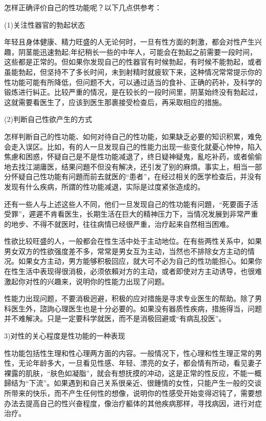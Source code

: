 \documentclass[12pt,UTF8]{ctexbook}
\begin{document}
怎样正确评价自己的性功能呢？以下几点供参考：

(1)关注性器官的勃起状态

年轻且身体健康、精力旺盛的人无论何时，一旦有性方面的刺激，都会对性产生兴趣，阴茎能迅速勃起;年纪稍长一些的中年人，可能会在勃起之前需要一段时间，这些都是正常的。但如果你发现自己的性器官有时候勃起，有时候不能勃起，或者虽能勃起，但坚持不了多长时间，未到射精时就疲软下来，这种情况常常提示你的性功能可能有所降低，但问题不大，可以通过适当的食补、正确的药补，及科学的锻炼进行糾正。比较严重的情况，是在较长的一段时间里，阴茎始终没有勃起过，这就需要看医生了，应该到医生那裹接受检查后，再采取相应的措施。

(2)判断自己性欲产生的方式

怎样判断自己的性功能、如何对待自己的性功能，如果缺乏必要的知识积累，难免会走入误区。比如，有的人一旦发现自己的性能力出现一些变化就憂心忡忡，陷入焦慮和困惑，怀疑自己是不是性功能减退了，终日疑神疑鬼，亂吃补药，或者偷偷地去找江湖庸医，结果问題不但没有解决，还引发了别的麻煩。事实上，相当一部分怀疑自己性功能有问題而前去就医的“患者”，在经过相关的医学检查后，并没有发现有什么疾病，所謂的性功能减退，实际是过度紧张造成的。

还有一些人与上述这些人不同，他们一旦发现自己的性功能有问題，“死要面子活受罪”，遲遲不肯看医生，长期生活在巨大的精神压力下，当情况发展到非常严重的地步、不得不就医时，往往病情已经很严重，治疗起来自然相当困难。

性欲比较旺盛的人，一般都会在性生活中处于主动地位。在有些两性关系中，如果男女双方的性欲强度差不多，常常是男女互为主动，当然也不排除女方主动的情况。如果女方主动，男方能够积极回应，就大可不必为自己的性功能担心。如果你在性生活中表现得很消极，必须依賴对方的主动，或者即使对方主动诱导，也很难激起你对性的兴趣来，说明你的性能力出现了问题。

性能力出现问题，不要消极迥避，积极的应对措施是寻求专业医生的帮助。除了男科医生外，諮詢心理医生也是十分必要的。如果没有器质性疾病，措施得当，问题并不难解决。只是一定要科学就医，而不是消极回避或“有病乱投医”。

3)对性的关心程度是性功能的一种表现

性功能包括性生理和性心理两方面的内容。一般情况下，性心理和性生理正常的男性，无论年龄多大，一旦看见性感、年轻、漂亮的女子，都会情有所动，看见妻子裸露的肌肤，“肤色如凝脂”，就会有想抚摸的冲动，这是正常的性反应，不能一概歸结为“下流”。如果遇到和自己关系很亲近、很鍾情的女性，只能产生一般的交谈所带来的快乐，而不产生任何性的想像，说明你的性感受开始变得迟钝了，需要想办法去提高自己的性兴奋程度，像治疗軀体的其他疾病那样，寻找病因，进行对症治疗。
\end{document}
